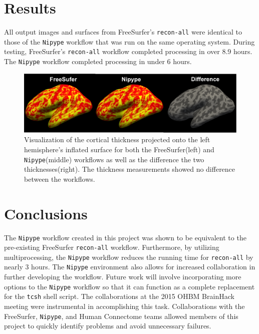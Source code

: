 \documentclass[twocolumn]{bmcart}%
\begin{document}
\section{Results}\label{results}

All output images and surfaces from FreeSurfer's \texttt{recon-all} were identical to those of the \texttt{Nipype} workflow that was run on the same operating system.
During testing, FreeSurfer's \texttt{recon-all} workflow completed processing in over 8.9 hours. The \texttt{Nipype} workflow completed processing in under 6 hours.

\begin{figure}[h]
\centering
\includegraphics[width=.45\textwidth]{FS6NipypeDiff.png}
\caption{Visualization of the cortical thickness projected onto the left hemisphere's inflated surface for both the FreeSurfer(left) and \texttt{Nipype}(middle) workflows as well as the difference the two thicknesses(right). The thickness measurements showed no difference between the workflows.}
\end{figure}
%
%

\section{Conclusions}\label{conclusions}

The \texttt{Nipype} workflow created in this project was shown to be equivalent to the pre-existing FreeSurfer \texttt{recon-all} workflow. 
Furthermore, by utilizing multiprocessing, the \texttt{Nipype} workflow reduces the running time for \texttt{recon-all} by nearly 3 hours. 
The \texttt{Nipype} environment also allows for increased collaboration in further developing the workflow. 
Future work will involve incorporating more options to the \texttt{Nipype} workflow so that it can function as a complete replacement for the \texttt{tcsh} shell script. 
The collaborations at the 2015 OHBM BrainHack meeting were instrumental in accomplishing this task. 
Collaborations with the FreeSurfer, \texttt{Nipype}, and Human Connectome teams allowed members of this project to quickly identify problems and avoid unnecessary failures.

\end{document}
